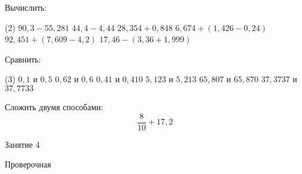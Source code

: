 \begin{homework}[number=3]
	\begin{listofex}
		\item Вычислить:
		\begin{tasks}(2)
			\task \( 90,3-55,281 \)
			\task \( 44,4-4,44 \)
			\task \( 28,354+0,848 \)
			\task \( 6,674+(1,426-0,24) \)
			\task \( 92,451+(7,609-4,2) \)
			\task \( 17,46-(3,36+1,999) \)
		\end{tasks}
		\item Сравнить:
		\begin{tasks}(3)
			\task \( 0,1 \) и \( 0,5 \)
			\task \( 0,62 \) и \( 0,6 \)
			\task \( 0,41 \) и \( 0,410 \)
			\task \( 5,123 \) и \( 5,213 \)
			\task \( 65,807 \) и \( 65,870 \)
			\task \( 37,3737 \) и \( 37,7733 \)
		\end{tasks}
		\item Сложить двумя способами:
		\[\dfrac{8}{10}+17,2\]
	\end{listofex}
\end{homework}

\begin{class}[number=4]
	\begin{listofex}
		\item Занятие 4
	\end{listofex}
\end{class}
	
\begin{exam}
	\begin{listofex}
		\item Проверочная
	\end{listofex}
\end{exam}
